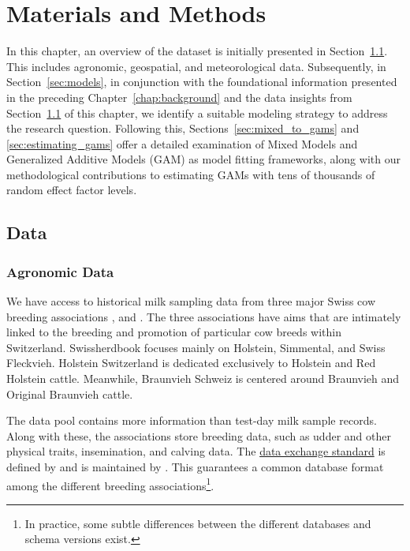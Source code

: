 \chapter{Materials and Methods}\label{chap:material_methods}
In this chapter, an overview of the dataset is initially presented in Section~\ref{sec:data}. This includes agronomic, geospatial, and meteorological data. Subsequently, in Section~\ref{sec:models}, in conjunction with the foundational information presented in the preceding Chapter~\ref{chap:background} and the data insights from Section~\ref{sec:data} of this chapter, we identify a suitable modeling strategy to address the research question. Following this, Sections~\ref{sec:mixed_to_gams} and \ref{sec:estimating_gams} offer a detailed examination of Mixed Models and Generalized Additive Models (GAM) as model fitting frameworks, along with our methodological contributions to estimating GAMs with tens of thousands of random effect factor levels.

\section{Data}\label{sec:data}
\subsection{Agronomic Data}\label{sec:agronomic_data}
We have access to historical milk sampling data from three major Swiss cow breeding associations \cite{swissherdbook2024}, \cite{braunvieh2024} and \cite{holsteinswitzerland2024}. The three associations have aims that are intimately linked to the breeding and promotion of particular cow breeds within Switzerland. Swissherdbook focuses mainly on Holstein, Simmental, and Swiss Fleckvieh. Holstein Switzerland is dedicated exclusively to Holstein and Red Holstein cattle. Meanwhile, Braunvieh Schweiz is centered around Braunvieh and Original Braunvieh cattle.

The data pool contains more information than test-day milk sample records. Along with these, the associations store breeding data, such as udder and other physical traits, insemination, and calving data. The \href{https://asr-ch.ch/images/content/Download-Ordner/Datenschnittstelle/RindviehCH_Interface-D.pdf}{data exchange standard} is defined by \cite{asr2024} and is maintained by \cite{qualitas2024}. This guarantees a common database format among the different breeding associations\footnote{In practice, some subtle differences between the different databases and schema versions exist.}.

